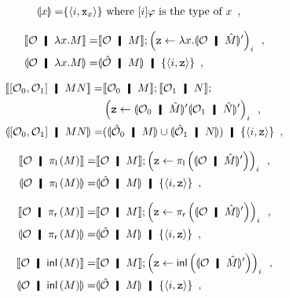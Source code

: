 {\begin{description}
\begin{align*}
 \llparenthesis{x}\rrparenthesis=& \{\langle{i,\texttt{x}_x}\rangle\} \text{ where $[i]\varphi$ is the type
 of $x$}\enspace,
\end{align*}
 \item[${\brac{i}}\bot\elim$] 
 \item[$\brac i\supset\intro$] 
\begin{align*}
 \semo{\hypert\hmid \lambda x.M}=& \semo{\hypert\hmid M}; \left(\p z\leftarrow
 \lambda x. \semoi{\hypert\hmid\hat M}'\right)_i \enspace,\\
 \semoi{\hypert\hmid \lambda x.M} =& \semoi{\hat\hypert\hmid M} \hmid
 \{\tuple{i,\p z}\}\enspace,
\end{align*}
 \item[$\brac i\supset\elim$] 
\begin{align*}
 \semo{\cotuple{\hypert_0,\hypert_1}\hmid MN}=& \semo{\hypert_0\hmid M}; \semo{\hypert_1\hmid N}; \\&
 \left(\p z\leftarrow \semoi{\hypert_0\hmid \hat M}'\semoi{\hypert_1\hmid \hat N}'\right)_i\enspace,\\
 \semoi{\cotuple{\hypert_0,\hypert_1}\hmid MN} =& (\semoi{\hat \hypert_0 \hmid M}\cup
 \semoi{\hat\hypert_1\hmid N})\hmid \{\tuple{i,\p z}\}\enspace,
\end{align*}
 \item[$\brac i\wedge\elim_0$] 
\begin{align*}
 \semo{\hypert\hmid \lpil M} =& \semo{\hypert\hmid M}; \left(\p z \leftarrow
 \lpil {\semoi{\hypert\hmid\hat M}'}\right)_i\enspace, \\
 \semoi{\hypert\hmid \lpil M}=& \semoi{\hat \hypert\hmid M}\hmid
 \{\tuple{i, \p z}\}\enspace,
\end{align*}
 \item[$\brac i\wedge\elim_1$] 
\begin{align*}
 \semo{\hypert\hmid \lpir M} =& \semo{\hypert\hmid M}; \left(\p z \leftarrow
 \lpir{ \semoi{\hypert\hmid\hat M}' }\right)_i\enspace, \\
 \semoi{\hypert\hmid \lpir M}=& \semoi{\hat \hypert\hmid M}\hmid
 \{\tuple{i, \p z}\}\enspace,
\end{align*}
 \item[$\brac i\vee\intro_0$] 
\begin{align*}
 \semo{\hypert\hmid \linl{M}} =& \semo{\hypert\hmid M}; \left(\p z \leftarrow
 \linl{ \semoi{\hypert\hmid\hat M}'}\right)_i\enspace, \\
 \semoi{\hypert\hmid \linl M}=& \semoi{\hat \hypert\hmid M}\hmid
 \{\tuple{i, \p z}\}\enspace,
\end{align*}

\end{description}}
